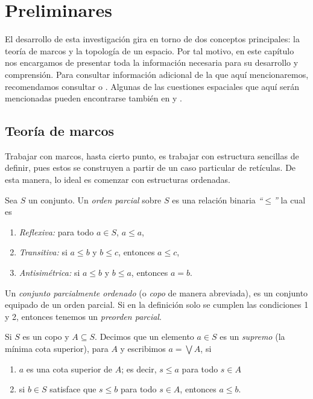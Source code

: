 \chapter{Preliminares}\label{Preliminares}

El desarrollo de esta investigación gira en torno de dos conceptos principales: la teoría de marcos y la topología de un espacio. 
Por tal motivo, en este capítulo nos encargamos de presentar toda la información necesaria para su desarrollo y comprensión.
Para consultar información adicional de la que aquí mencionaremos, recomendamos consultar \cite{P.T.} o \cite{J.P.}. 
Algunas de las cuestiones espaciales que aquí serán mencionadas pueden encontrarse también en \cite{R.S.} y \cite{R.S.3}.  

\section{Teoría de marcos}\label{marcos}

Trabajar con marcos, hasta cierto punto, es trabajar con estructura sencillas de definir, pues estos se construyen a partir de un caso particular de retículas. De esta manera, 
lo ideal es comenzar con estructuras ordenadas.

\begin{dfn}\label{Copo}
Sea $S$ un conjunto. Un \emph{orden parcial} sobre $S$ es una relación binaria \emph{``$\leq$''} la cual es 
\begin{enumerate}
\item \emph{Reflexiva:} para todo $a\in S$, $a\leq a$,
\item \emph{Transitiva:} si $a\leq b$ y $b\leq c$, entonces $a\leq c$,
\item \emph{Antisimétrica:} si $a\leq b$ y $b\leq a$, entonces $a=b$. 
\end{enumerate}
Un \emph{conjunto parcialmente ordenado} (o \emph{copo} de manera abreviada), es un conjunto equipado de un orden parcial. Si en la definición solo se cumplen las condiciones 1 y 2, entonces tenemos un \emph{preorden parcial}.
\end{dfn}

\begin{dfn}\label{Supremo}
Si $S$ es un copo y $A\subseteq S$. Decimos que un elemento $a\in S$ es un \emph{supremo} (la mínima cota superior), para $A$ y escribimos $a=\bigvee A$, si
\begin{enumerate}
\item $a$ es una cota superior de $A$; es decir, $s\leq a$ para todo $s\in A$
\item si $b\in S$ satisface que $s\leq b$ para todo $s\in A$, entonces $a\leq b$.
\end{enumerate}
\end{dfn}

